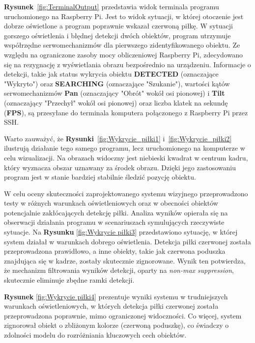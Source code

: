 \documentclass[a4paper,twoside,12pt]{book}
\begin{document}
\textbf{Rysunek}~\ref{fig:TerminalOutput} przedstawia widok terminala programu uruchomionego na Raspberry Pi. Jest to widok sytuacji, w której otoczenie jest dobrze oświetlone a program poprawnie wskazał czerwoną piłkę. W sytuacji gorszego oświetlenia i błędnej detekcji dwóch obiektów, program utrzymuje współrzędne serwomechanizmów dla pierwszego zidentyfikowanego obiektu. Ze względu na ograniczone zasoby mocy obliczeniowej Raspberry Pi, zdecydowano się na rezygnację z wyświetlania obrazu bezpośrednio na urządzeniu. Informacje o detekcji, takie jak status wykrycia obiektu \textbf{DETECTED} (oznaczające "Wykryto") oraz \textbf{SEARCHING} (oznaczające "Szukanie"), wartości kątów serwomechanizmów \textbf{Pan} (oznaczający "Obrót" wokół osi pionowej) i \textbf{Tilt} (oznaczający "Przechył" wokół osi pionowej) oraz liczba klatek na sekundę (\textbf{FPS}), są przesyłane do terminala komputera połączonego z Raspberry Pi przez SSH.

Warto zauważyć, że \textbf{Rysunki}~\ref{fig:Wykrycie_piłki1} i~\ref{fig:Wykrycie_piłki2} ilustrują działanie tego samego programu, lecz uruchomionego na komputerze w celu wizualizacji. Na obrazach widoczny jest niebieski kwadrat w centrum kadru, który wyznacza obszar uznawany za środek obrazu. Dzięki jego zastosowaniu program jest w stanie bardziej stabilnie śledzić pozycję obiektu. 



\newpage
W celu oceny skuteczności zaprojektowanego systemu wizyjnego przeprowadzono testy w różnych warunkach oświetleniowych oraz w obecności obiektów potencjalnie zakłócających detekcję piłki. Analiza wyników opierała się na obserwacji działania programu w scenariuszach symulujących rzeczywiste sytuacje. Na \textbf{Rysunku} \ref{fig:Wykrycie piłki3} przedstawiono sytuację, w której system działał w warunkach dobrego oświetlenia. Detekcja piłki czerwonej została przeprowadzona prawidłowo, a inne obiekty, takie jak czerwona poduszka znajdująca się w kadrze, zostały skutecznie zignorowane. Wynik ten potwierdza, że mechanizm filtrowania wyników detekcji, oparty na \textit{non-max suppression}, skutecznie eliminuje zbędne ramki detekcji.

\textbf{Rysunek} \ref{fig:Wykrycie piłki4} prezentuje wyniki systemu w trudniejszych warunkach oświetleniowych, w których detekcja piłki czerwonej została przeprowadzona poprawnie, mimo ograniczonej widoczności. Co więcej, system zignorował obiekt o zbliżonym kolorze (czerwoną poduszkę), co świadczy o zdolności modelu do rozróżniania kluczowych cech obiektów.
\end{document}
